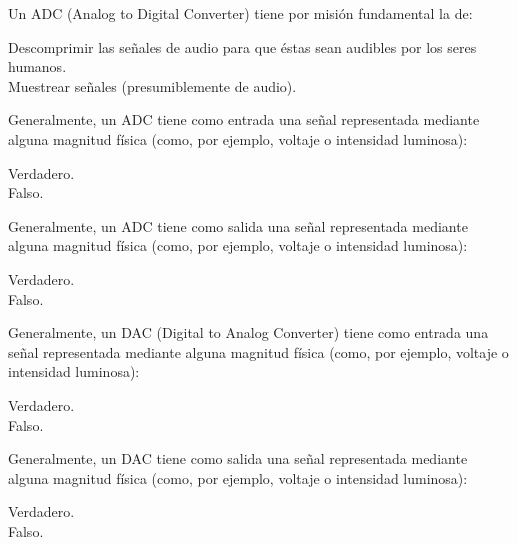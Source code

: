 \documentclass[legalpaper, 12pt, addpoints]{exam}
\begin{document}
\begin{questions}
\vspace{0.10in}

\question Un ADC (Analog to Digital Converter) tiene por misión fundamental la de:

\begin{oneparchoices}
  \choice Descomprimir las señales de audio para que éstas sean audibles por los seres humanos.\\
  \choice Muestrear señales (presumiblemente de audio).
\end{oneparchoices}
  
\vspace{0.10in}

\question Generalmente, un ADC tiene como entrada una señal representada mediante
alguna magnitud física (como, por ejemplo, voltaje o intensidad
luminosa):

\begin{oneparchoices}
  \choice Verdadero.\\
  \choice Falso.
\end{oneparchoices}
  
\vspace{0.10in}

\question Generalmente, un ADC tiene como salida una señal representada mediante
alguna magnitud física (como, por ejemplo, voltaje o intensidad
luminosa):

\begin{oneparchoices}
  \choice Verdadero.\\
  \choice Falso.
\end{oneparchoices}

\question Generalmente, un DAC (Digital to Analog Converter) tiene como entrada una
señal representada mediante alguna magnitud física (como, por ejemplo,
voltaje o intensidad luminosa):

\begin{oneparchoices}
  \choice Verdadero.\\
  \choice Falso.
\end{oneparchoices}
  
\vspace{0.10in}

\question Generalmente, un DAC tiene como salida una señal representada mediante
alguna magnitud física (como, por ejemplo, voltaje o intensidad
luminosa):

\begin{oneparchoices}
  \choice Verdadero.\\
  \choice Falso.
\end{oneparchoices}
  

\end{questions}
\end{document}
